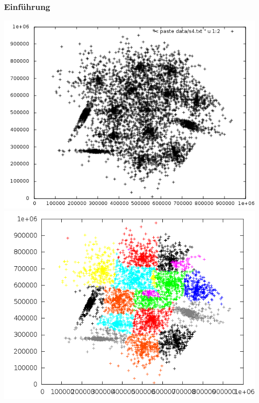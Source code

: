 \documentclass[10pt]{beamer}
\begin{document}
\begin{frame}
	\frametitle{Einf\"uhrung}
	\includegraphics[scale=0.34, keepaspectratio]{../output/pics/s4_black.png}
	\includegraphics[scale=0.34, keepaspectratio]{../output/pics/s4_colored.png}
\end{frame}
\end{document}
